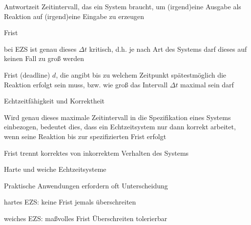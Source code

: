 \documentclass[a4paper]{article}
\begin{document}
\begin{multicols}{3}
    \begin{description*}
        \item[Antwortzeit] Zeitintervall, das ein System braucht, um (irgend)eine Ausgabe als Reaktion auf (irgend)eine Eingabe zu erzeugen
        \item[Frist]
        \begin{itemize*}
            \item bei EZS ist genau dieses $\Delta t$ kritisch, d.h. je nach Art des Systems darf dieses auf keinen Fall zu groß werden
            \item Frist (deadline) $d$, die angibt bis zu welchem Zeitpunkt spätestmöglich die Reaktion erfolgt sein muss, bzw. wie groß das Intervall $\Delta t$ maximal sein darf
        \end{itemize*}
        \item[Echtzeitfähigkeit und Korrektheit]
        \begin{itemize*}
            \item Wird genau dieses maximale Zeitintervall in die Spezifikation eines Systems einbezogen, bedeutet dies, dass ein Echtzeitsystem nur dann korrekt arbeitet, wenn seine Reaktion bis zur spezifizierten Frist erfolgt
            \item Frist trennt korrektes von inkorrektem Verhalten des Systems
        \end{itemize*}
        \item[Harte und weiche Echtzeitsysteme]
        \begin{itemize*}
            \item Praktische Anwendungen erfordern oft Unterscheidung
            \item hartes EZS: keine Frist jemals überschreiten
            \item weiches EZS: maßvolles Frist Überschreiten tolerierbar
        \end{itemize*}
    \end{description*}


\end{multicols}
\end{document}
